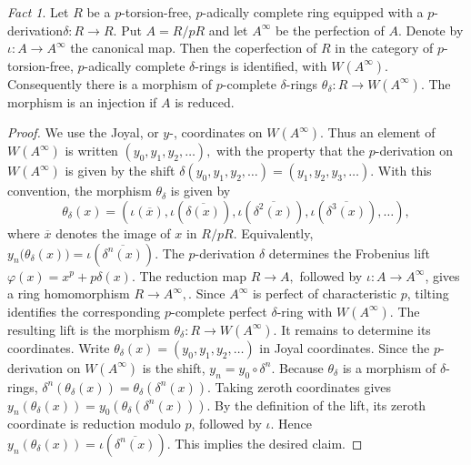 \documentclass[12pt,reqno]{amsart}
\theoremstyle{definition}
\theoremstyle{remark}
\theoremstyle{cited}
\theoremstyle{remark}
\newtheorem{fact}[theorem]{Fact}
\theoremstyle{citeddef}
\newcommand{\perf}{\infty}
\begin{document}
	\begin{fact}
		Let \(R\) be a \(p\)-torsion-free, \(p\)-adically complete ring equipped with a \(p\)-derivation$
		\delta:R\to R.$ Put $A=R/pR$ and let $A^{\perf}$ be the perfection of \(A\). Denote by
		$\iota:A\to A^{\perf}$ the canonical map. Then the coperfection of \(R\) in the category of \(p\)-torsion-free, \(p\)-adically complete \(\delta\)-rings is identified,   with
		$W(A^{\perf}).$ Consequently there is a morphism of \(p\)-complete \(\delta\)-rings
		$\theta_\delta:R\to W(A^{\perf}). $ The morphism is an injection if $A$ is reduced.
	\end{fact}
	
	\begin{proof}
		We use the Joyal, or \(y\)-, coordinates on \(W(A^{\perf})\). Thus an element of \(W(A^{\perf})\) is written
		$
		(y_0,y_1,y_2,\ldots),
		$
		with the property that the \(p\)-derivation on \(W(A^{\perf})\) is given by the shift
		$
		\delta(y_0,y_1,y_2,\ldots)
		=
		(y_1,y_2,y_3,\ldots).
		$
		With this convention, the morphism \(\theta_\delta\) is given by
		$$\theta_\delta(x)
		=
		\left(
		\iota(\overline{x}),
		\iota(\overline{\delta(x)}),
		\iota(\overline{\delta^2(x)}),
		\iota(\overline{\delta^3(x)}),
		\ldots
		\right),
		$$ 
		where \(\overline{x}\) denotes the image of \(x\) in \(R/pR\). Equivalently,
		$
		y_n\bigl(\theta_\delta(x)\bigr)
		=
		\iota (\overline{\delta^n(x)})
		.
		$
		The \(p\)-derivation \(\delta\) determines the Frobenius lift	
		$
		\varphi(x)=x^p+p\delta(x).
		$
		The reduction map
		$
		R\to A,
		$
		followed by \(\iota:A\to A^{\perf}\), gives a ring homomorphism
		$
		R\to A^{\perf},
		.
		$
		Since \(A^{\perf}\) is perfect of characteristic \(p\), tilting identifies the corresponding \(p\)-complete perfect \(\delta\)-ring with
		$
		W(A^{\perf}).
		$
		The resulting lift is the morphism
		$
		\theta_\delta:R\to W(A^{\perf}).
		$ It remains to determine its coordinates. Write
		$
		\theta_\delta(x)
		=
		(y_0,y_1,y_2,\ldots)
		$ in Joyal coordinates. Since the \(p\)-derivation on \(W(A^{\perf})\) is the shift,
		$
		y_n
		=
		y_0\circ\delta^n.
		$
		Because \(\theta_\delta\) is a morphism of \(\delta\)-rings,
		$\delta^n(\theta_\delta(x))=
		\theta_\delta(\delta^n(x)).$
		Taking zeroth coordinates gives
		$y_n(\theta_\delta(x))
		=
		y_0(\theta_\delta(\delta^n(x))).
		$ By the definition of the lift, its zeroth coordinate is reduction modulo \(p\), followed by \(\iota\). Hence
		$y_n(\theta_\delta(x))
		=
		\iota(\overline{\delta^n(x)}).$
		This implies the desired claim.
	\end{proof}
	
\end{document}
